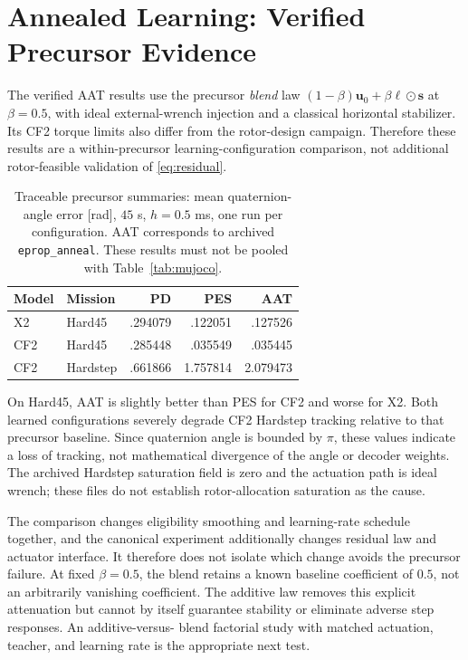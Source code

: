 \documentclass[letterpaper,10pt,conference]{IEEEtran}
\begin{document}
\section{Annealed Learning: Verified Precursor Evidence}
\label{sec:legacy}
The verified AAT results use the precursor \emph{blend} law
$(1-\beta)\bm u_0+\beta\bm\ell\odot\bm s$ at $\beta=0.5$, with ideal
external-wrench injection and a classical horizontal stabilizer. Its CF2
torque limits also differ from the rotor-design campaign. Therefore these
results are a within-precursor learning-configuration comparison, not
additional rotor-feasible validation of \eqref{eq:residual}.

\begin{table}[t]
\caption{Traceable precursor summaries: mean quaternion-angle error [rad],
$45$ s, $h=0.5$ ms, one run per configuration. AAT corresponds to archived
\texttt{eprop\_anneal}. These results must not be pooled with
Table~\ref{tab:mujoco}.}
\label{tab:aat}\centering\small
\begin{tabular}{llrrr}
\toprule
Model&Mission&PD&PES&AAT\\\midrule
X2&Hard45&.294079&.122051&.127526\\
CF2&Hard45&.285448&.035549&.035445\\
CF2&Hardstep&.661866&1.757814&2.079473\\\bottomrule
\end{tabular}
\end{table}
On Hard45, AAT is slightly better than PES for CF2 and worse for X2.
Both learned configurations severely degrade CF2 Hardstep tracking relative
to that precursor baseline. Since quaternion angle is bounded by $\pi$,
these values indicate a loss of tracking, not mathematical divergence of
the angle or decoder weights. The archived Hardstep saturation field is
zero and the actuation path is ideal wrench; these files do not establish
rotor-allocation saturation as the cause.

The comparison changes eligibility smoothing and learning-rate schedule
together, and the canonical experiment additionally changes residual law
and actuator interface. It therefore does not isolate which change avoids
the precursor failure. At fixed $\beta=0.5$, the blend retains a known
baseline coefficient of $0.5$, not an arbitrarily vanishing coefficient.
The additive law removes this explicit attenuation but cannot by itself
guarantee stability or eliminate adverse step responses. An additive-versus-
blend factorial study with matched actuation, teacher, and learning rate
is the appropriate next test.
\end{document}
